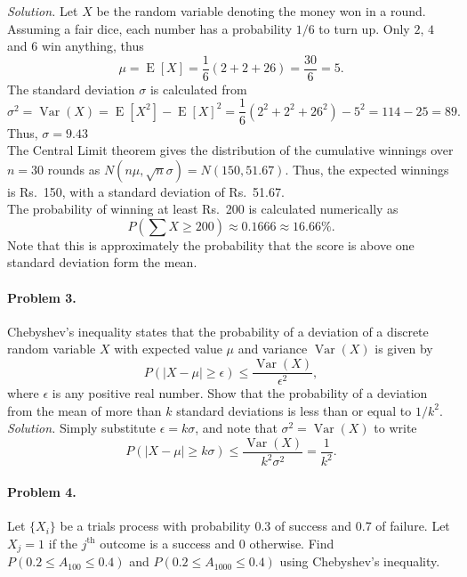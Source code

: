 \documentclass[10pt]{article}
\newcommand\var[1]{\operatorname{Var}(#1)}
\newcommand\E[1]{\operatorname{E}[#1]}
\begin{document}
        \textit{Solution.} Let $X$ be the random variable denoting the money won in a round. Assuming a fair dice, each number has a probability 
        $1 /6$ to turn up. Only $2$, $4$ and $6$ win anything, thus
        \[
                \mu = \E{X} = \frac{1}{6}(2 + 2 + 26) = \frac{30}{6} = 5.
        \]
        The standard deviation $\sigma$ is calculated from
        \[
                \sigma^2 = \var{X} = \E{X^2} - \E{X}^2 = \frac{1}{6}(2^2 + 2^2 + 26^2) - 5^2 = 114 - 25 = 89.
        \]
        Thus, $\sigma = 9.43$ \\

        The Central Limit theorem gives the distribution of the cumulative winnings over $n = 30$ rounds as $N(n\mu, \sqrt{n}\sigma) = N(150, 51.67)$.
        Thus, the expected winnings is Rs.\ 150, with a standard deviation of Rs.\ 51.67. \\
        
        The probability of winning at least Rs.\ 200 is calculated numerically as
        \[
                P\left(\sum X \geq 200\right) \approx 0.1666 \approx 16.66\%.
        \]
        Note that this is approximately the probability that the score is above one standard deviation form the mean.
        
        \paragraph{Problem 3.} Chebyshev's inequality states that the probability of a deviation of a discrete random variable $X$ with expected
        value $\mu$ and variance $\var{X}$ is given by
        \[
                P(|X - \mu| \geq \epsilon) \leq \frac{\var{X}}{\epsilon^2},
        \]
        where $\epsilon$ is any positive real number.
        Show that the probability of a deviation from the mean of more than $k$ standard deviations is less than or equal to $1 /k^2$. \\

        \textit{Solution.} Simply substitute $\epsilon = k\sigma$, and note that $\sigma^2 = \var{X}$ to write
        \[
                P(|X - \mu| \geq k\sigma) \leq \frac{\var{X}}{k^2\sigma^2} = \frac{1}{k^2}.
        \]

        \paragraph{Problem 4.} Let $\{X_i\}$ be a trials process with probability 0.3 of success and 0.7 of failure.
        Let $X_j = 1$ if the $j^\text{th}$ outcome is a success and $0$ otherwise.
        Find $P(0.2 \leq A_{100} \leq 0.4)$ and $P(0.2 \leq A_{1000} \leq 0.4)$ using Chebyshev's inequality. \\
\end{document}
